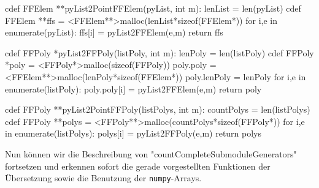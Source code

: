 \begin{sagecode}[caption={[\texttt{FFElem **pyList2PointFFElem} aus 
 \url{../Sage/enumeratePCNs.spyx}]Aus \url{../Sage/enumeratePCNs.spyx}}]
cdef FFElem **pyList2PointFFElem(pyList, int m):
    lenList = len(pyList)
    cdef FFElem **ffs = <FFElem**>malloc(lenList*sizeof(FFElem*))
    for i,e in enumerate(pyList):
        ffs[i] = pyList2FFElem(e,m)
    return ffs
\end{sagecode}

\begin{sagecode}[caption={[\texttt{FFPoly *pyList2FFPoly} aus 
 \url{../Sage/enumeratePCNs.spyx}]Aus \url{../Sage/enumeratePCNs.spyx}}]
cdef FFPoly *pyList2FFPoly(listPoly, int m):
    lenPoly = len(listPoly)
    cdef FFPoly *poly = <FFPoly*>malloc(sizeof(FFPoly))
    poly.poly = <FFElem**>malloc(lenPoly*sizeof(FFElem*))
    poly.lenPoly = lenPoly
    for i,e in enumerate(listPoly):
        poly.poly[i] = pyList2FFElem(e,m)
    return poly
\end{sagecode}

\begin{sagecode}[caption={[\texttt{FFPoly **pyList2PointFFPoly} aus 
 \url{../Sage/enumeratePCNs.spyx}]Aus \url{../Sage/enumeratePCNs.spyx}}]
cdef FFPoly **pyList2PointFFPoly(listPolys, int m):
    countPolys = len(listPolys)
    cdef FFPoly **polys = <FFPoly**>malloc(countPolys*sizeof(FFPoly*))
    for i,e in enumerate(listPolys):
        polys[i] = pyList2FFPoly(e,m)
    return polys
\end{sagecode}


Nun können wir die Beschreibung von "countCompleteSubmoduleGenerators"
fortsetzen und erkennen sofort die gerade vorgestellten Funktionen der
Übersetzung sowie die Benutzung der \texttt{numpy}-Arrays.

